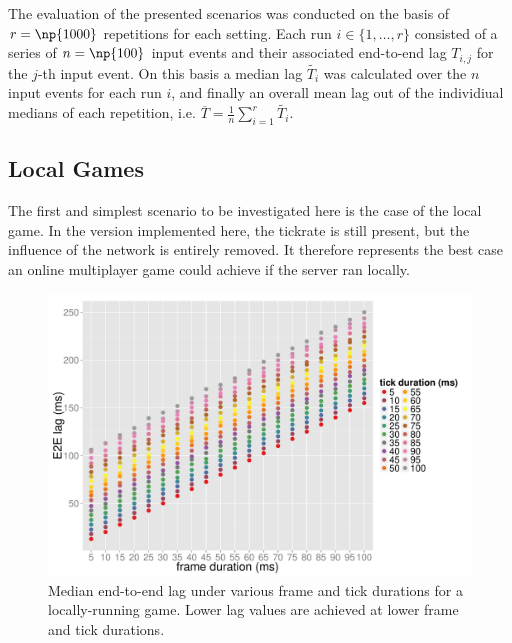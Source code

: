 The evaluation of the presented scenarios was conducted on the basis of $r=\np{1000}$ repetitions for each setting. Each run $i \in \{1,\dots,r\}$ consisted of a series of $n=\np{100}$ input events and their associated end-to-end lag $T_{i,j}$ for the $j$-th input event. On this basis a median lag $\widetilde{T_i}$ was calculated over the $n$ input events for each run $i$, and finally an overall mean lag out of the individiual medians of each repetition, i.e. $\overline{T}=\frac{1}{n}\sum_{i=1}^r\widetilde{T_i}$.


\subsection{Local Games}

The first and simplest scenario to be investigated here is the case of the local game. In the version implemented here, the tickrate is still present, but the influence of the network is entirely removed. It therefore represents the best case an online multiplayer game could achieve if the server ran locally.

\begin{figure}[!t]
	\centering
	\includegraphics[width=1.0\columnwidth]{../../simulation/visualization/nwless-onlinegame-1000rounds.pdf}
	\caption{Median end-to-end lag under various frame and tick durations for a locally-running game. Lower lag values are achieved at lower frame and tick durations.}
\label{fig:nwless-scatter}
\end{figure}

